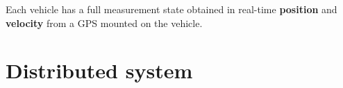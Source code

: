 \documentclass[letterpaper, 10pt, conference]{ieeeconf}  %
\begin{document}
Each vehicle has a full measurement state obtained in real-time \textbf{position} and \textbf{velocity} from a GPS mounted on the vehicle. 










   

\section{Distributed system}
\end{document}
